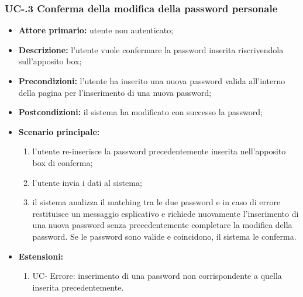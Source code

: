 \subsubsection{UC-.3 Conferma della modifica della password personale}
\begin{itemize}
	\item \textbf{Attore primario:} utente non autenticato;

	\item \textbf{Descrizione:} l'utente vuole confermare la password inserita riscrivendola sull'apposito box;

	\item \textbf{Precondizioni:} l'utente ha inserito una nuova password valida all'interno della pagina per l'inserimento di una nuova password;

	\item \textbf{Postcondizioni:} il sistema ha modificato con successo la password;

	\item \textbf{Scenario principale:}
	      \begin{enumerate}
		      \item l'utente re-inserisce la password precedentemente inserita nell'apposito box di conferma;
		      \item l'utente invia i dati al sistema;
		      \item il sistema analizza il matching tra le due password e in caso di errore restituisce un messaggio esplicativo e richiede nuovamente l'inserimento di una nuova password senza precedentemente completare la modifica della password. Se le password sono valide e coincidono, il sistema le conferma.
	      \end{enumerate}
	\item \textbf{Estensioni:}
	      \begin{enumerate}
	      \item UC- Errore: inserimento di una password non corrispondente a quella inserita precedentemente.
	      \end{enumerate}
\end{itemize}

